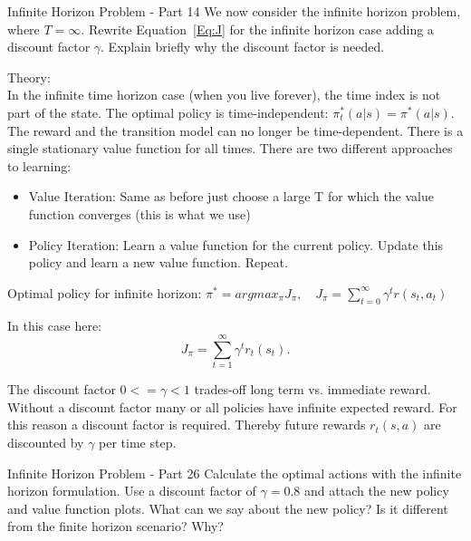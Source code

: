 \begin{questions}


\begin{question}{Infinite Horizon Problem - Part 1}{4}
We now consider the infinite horizon problem, where $T=\infty$. Rewrite Equation~\eqref{Eq:J} for the infinite horizon case adding a discount factor $\gamma$. Explain briefly why the discount factor is needed.

\begin{answer}
Theory: \\
In the infinite time horizon case (when you live forever), the time index is not part of the state.  The optimal policy is time-independent: $\pi_t^*(a|s)=\pi^*(a|s)$. The reward and the transition model can no longer be time-dependent. There is a single stationary value function for all times. There are two different approaches to learning:
\begin{itemize}
	\item Value Iteration: Same as before just choose a large T for which the value function converges (this is what we use)
	\item Policy Iteration: Learn a value function for the current policy. Update this policy and learn a new value function. Repeat.
\end{itemize}
Optimal policy for infinite horizon: $\pi^*=argmax_\pi J_\pi, \quad J_\pi=\sum_{t=0}^\infty \gamma^t r(s_t, a_t)$

In this case here:\\
\begin{equation}
J_\pi = \sum_{t=1}^{\infty} \gamma^t r_t(s_t).
\end{equation}

The discount factor $0<=\gamma<1$ trades-off long term vs. immediate reward. Without a discount factor many or all policies have infinite expected reward. For this reason a discount factor is required. Thereby future rewards $r_t(s,a)$ are discounted by $\gamma$ per time step.


	
\end{answer}

\end{question}



\begin{question}{Infinite Horizon Problem - Part 2}{6}
Calculate the optimal actions with the infinite horizon formulation. Use a discount factor of $\gamma=0.8$ and attach the new policy and value function plots.
What can we say about the new policy? Is it different from the finite horizon scenario? Why?


\end{question}
\end{questions}
